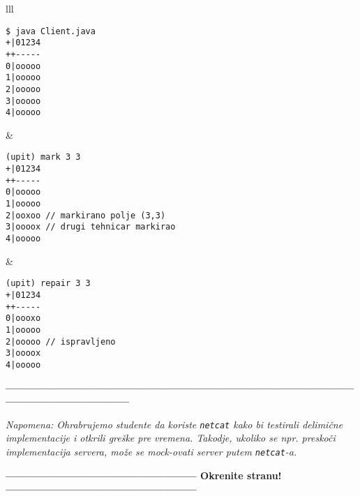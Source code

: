 \documentclass[]{article}
\begin{document}
\begin{enumerate}
\noindent
\begin{tabular}{lll}
\begin{lstlisting}
$ java Client.java
+|01234
++-----
0|ooooo
1|ooooo
2|ooooo
3|ooooo
4|ooooo
\end{lstlisting}&
\begin{lstlisting}
(upit) mark 3 3
+|01234
++-----
0|ooooo
1|ooooo
2|ooxoo // markirano polje (3,3)
3|oooox // drugi tehnicar markirao
4|ooooo
\end{lstlisting}&
\begin{lstlisting}
(upit) repair 3 3
+|01234
++-----
0|oooxo
1|ooooo
2|ooooo // ispravljeno
3|oooox
4|ooooo
\end{lstlisting}
\end{tabular}

\vspace{15pt}

\begin{center}
  \textbf{------------------------------------------------------------------------------------------------------------------------------}
\end{center}
\textit{Napomena: Ohrabrujemo studente da koriste \texttt{netcat} kako bi testirali delimi\v{c}ne implementacije i otkrili gre\v{s}ke pre vremena. Takodje, ukoliko se npr. presko\v{c}i implementacija servera, mo\v{z}e se mock-ovati server putem \texttt{netcat}-a.} 
\begin{center}
  \textbf{--------------------------------------------------- Okrenite stranu! ---------------------------------------------------}
\end{center}

\newpage


\end{enumerate}
\end{document}
